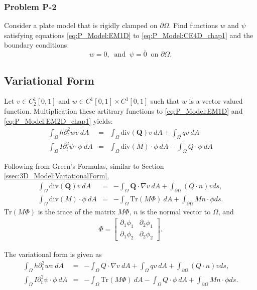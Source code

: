 \documentclass[../../main.tex]{subfiles}
\begin{document}
	\subsubsection{Problem P-2}\label{sssec:P_Model:ProblemP2}
	Consider a plate model that is rigidly clamped on $\partial \Omega$. Find functions $w$ and $\psi$ satisfying equations \eqref{eq:P_Model:EM1D} to \eqref{eq:P_Model:CE4D_chap1} and the boundary conditions:\\
	
	\[w = 0,  \ \textrm{ and } \ \psi = \bar{0} \ \textrm{ on } \partial \Omega.\]
	
	\subsection{Variational Form}\label{ssec:P_Model:VariationalForm}
	Let $v \in C_2^1[0,1]$ and $w \in C^1[0,1] \times C^1[0,1]$ such that $w$ is a vector valued function. Multiplication these artitrary functions to \eqref{eq:P_Model:EM1D} and \eqref{eq:P_Model:EM2D_chap1} yields:
	\begin{eqnarray*}
		\int_\Omega h \partial_t^2 w v \ dA & = & \int_\Omega \textrm{div} (\mathbf{Q}) v \ dA + \int_\Omega q v \ dA\\
		\int_\Omega I \partial_t^2 \psi \cdot \phi \ dA & = & \int_\Omega \textrm{div} (M) \cdot \phi \ dA - \int_\Omega Q \cdot \phi \ dA
	\end{eqnarray*}
	
	Following from Green's Formulas, similar to Section \ref{ssec:3D_Model:VariationalForm}, 
	\begin{eqnarray*}
		\int_\Omega \textrm{div}(\mathbf{Q}) v \ dA & = & - \int_\Omega \mathbf{Q} \cdot \nabla v \ dA + \int_{\partial\Omega} (Q\cdot n)v ds,\\
		\int_\Omega \textrm{div}(M) \cdot \phi \ dA & = & - \int_\Omega \textrm{Tr} (M \Phi) \ dA + \int_{\partial\Omega} M n \cdot \phi ds.
	\end{eqnarray*}
	$\textrm{Tr} (M \Phi)$ is the trace of the matrix $M \Phi$, $n$ is the normal vector to $\Omega$, and 
	\begin{eqnarray*}
		\Phi = 
		\begin{bmatrix}
			\partial_1\phi_1 & \partial_2\phi_1\\
			\partial_1\phi_2 & \partial_2\phi_2
		\end{bmatrix}.
	\end{eqnarray*}
	
	The variational form is given as
	\begin{align}
		\int_\Omega h \partial_t^2 w v \ dA & = & - \int_\Omega Q \cdot \nabla v \ dA + \int_\Omega q v \ dA + \int_{\partial\Omega} (Q\cdot n)v ds, \label{P1}\\
		\int_\Omega I \partial_t^2 \psi \cdot \phi \ dA & = & - \int_\Omega \textrm{Tr} (M \Phi) \ dA - \int_\Omega Q \cdot \phi \ dA + \int_{\partial\Omega} M n \cdot \phi ds. \label{P2}
	\end{align}
\end{document}
